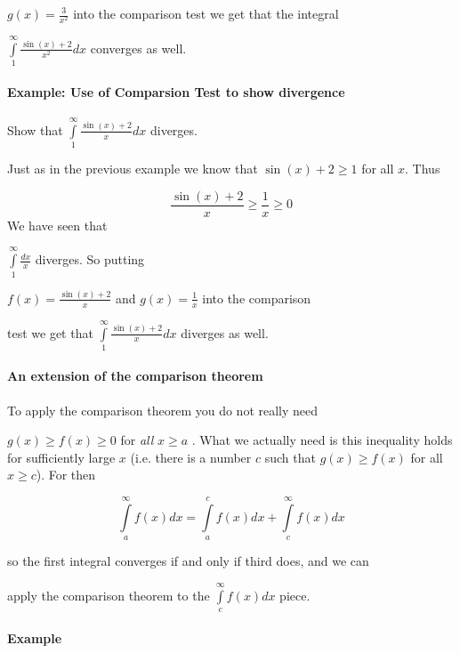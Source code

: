 $g(x)=\frac{3}{x^2}$ into the comparison test we get that the integral

$\int\limits _1^\infty\frac{\sin(x)+2}{x^2}dx$ converges as well.



\paragraph{Example: Use of Comparsion Test to show divergence}



Show that $\int\limits _1^\infty\frac{\sin(x)+2}{x}dx$ diverges.



Just as in the previous example we know that $\sin(x)+2\ge1$ for all $x$. Thus



$$\frac{\sin(x)+2}{x}\ge\frac{1}{x}\ge0$$ We have seen that

$\int\limits _1^\infty\frac{dx}{x}$ diverges. So putting

$f(x)=\frac{\sin(x)+2}{x}$ and $g(x)=\frac{1}{x}$ into the comparison

test we get that $\int\limits _1^\infty\frac{\sin(x)+2}{x}dx$ diverges as well.



\paragraph{An extension of the comparison theorem}



To apply the comparison theorem you do not really need

$g(x)\ge f(x)\ge0$ for \textit{all} $x\ge a$ . What we actually need is this inequality holds for sufficiently large $x$ (i.e. there is a number $c$ such that $g(x)\ge f(x)$ for all $x\ge c$). For then



$$\int\limits _a^\infty f(x)dx=\int\limits _a^c f(x)dx+\int\limits _c^\infty f(x)dx$$

so the first integral converges if and only if third does, and we can

apply the comparison theorem to the $\int\limits _c^\infty f(x)dx$ piece.



\paragraph{Example}



